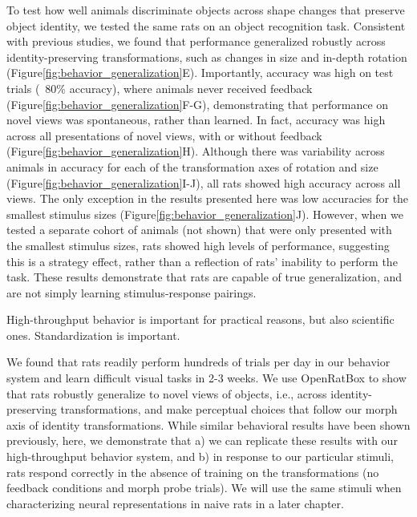 To test how well animals discriminate objects across shape changes that preserve object identity, we tested the same rats on an object recognition task. Consistent with previous studies\cite{Zoccolan2009, Tafazoli2012Transformation-TolerantPriming, REFREF}, we found that performance generalized robustly across identity-preserving transformations, such as changes in size and in-depth rotation (Figure\ref{fig:behavior_generalization}E). Importantly, accuracy was high on test trials (~80\% accuracy), where animals never received feedback (Figure\ref{fig:behavior_generalization}F-G), demonstrating that performance on novel views was spontaneous, rather than learned. In fact, accuracy was high across all presentations of novel views, with or without feedback (Figure\ref{fig:behavior_generalization}H). Although there was variability across animals in accuracy for each of the transformation axes of rotation and size (Figure\ref{fig:behavior_generalization}I-J), all rats showed high accuracy across all views. The only exception in the results presented here was low accuracies for the smallest stimulus sizes (Figure\ref{fig:behavior_generalization}J). However, when we tested a separate cohort of animals (not shown) that were only presented with the smallest stimulus sizes, rats showed high levels of performance, suggesting this is a strategy effect, rather than a reflection of rats' inability to perform the task\cite{Masis2020}. These results demonstrate that rats are capable of true generalization, and are not simply learning stimulus-response pairings. 

High-throughput behavior is important for practical reasons, but also scientific ones. 
Standardization is important. 

We found that rats readily perform hundreds of trials per day in our behavior system and learn difficult visual tasks in 2-3 weeks. We use OpenRatBox to show that rats robustly generalize to novel views of objects, i.e., across identity-preserving transformations, and make perceptual choices that follow our morph axis of identity transformations. While similar behavioral results have been shown previously\cite{Zoccolan2009, Tafazoli2012Transformation-TolerantPriming, Vermaercke2012}, here, we demonstrate that a) we can replicate these results with our high-throughput behavior system, and b) in response to our particular stimuli, rats respond correctly in the absence of training on the transformations (no feedback conditions and morph probe trials). We will use the same stimuli when characterizing neural representations in naive rats in a later chapter. 

